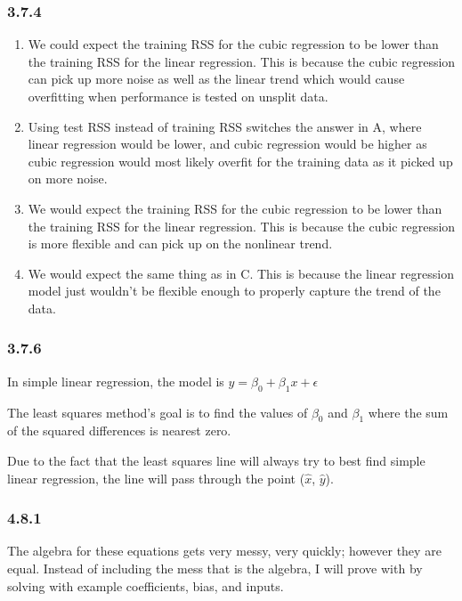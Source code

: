 \documentclass[
]{article}
\begin{document}
\subsubsection{3.7.4}\label{section-2}

\begin{enumerate}
\def\labelenumi{\alph{enumi}.}
\item
  We could expect the training RSS for the cubic regression to be lower
  than the training RSS for the linear regression. This is because the
  cubic regression can pick up more noise as well as the linear trend
  which would cause overfitting when performance is tested on unsplit
  data.
\item
  Using test RSS instead of training RSS switches the answer in A, where
  linear regression would be lower, and cubic regression would be higher
  as cubic regression would most likely overfit for the training data as
  it picked up on more noise.
\item
  We would expect the training RSS for the cubic regression to be lower
  than the training RSS for the linear regression. This is because the
  cubic regression is more flexible and can pick up on the nonlinear
  trend.
\item
  We would expect the same thing as in C. This is because the linear
  regression model just wouldn't be flexible enough to properly capture
  the trend of the data.
\end{enumerate}

\subsubsection{3.7.6}\label{section-3}

In simple linear regression, the model is
\(y=\beta_{0}+\beta_{1}x+\epsilon\)

The least squares method's goal is to find the values of \(\beta_{0}\)
and \(\beta_{1}\) where the sum of the squared differences is nearest
zero.

Due to the fact that the least squares line will always try to best find
simple linear regression, the line will pass through the point
(\(\hat{x}\), \(\hat{y}\)).

\subsubsection{4.8.1}\label{section-4}

The algebra for these equations gets very messy, very quickly; however
they are equal. Instead of including the mess that is the algebra, I
will prove with by solving with example coefficients, bias, and inputs.
\end{document}
